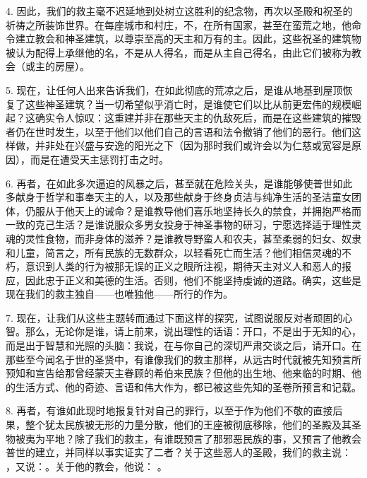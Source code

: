 4. 因此，我们的救主毫不迟延地到处树立这胜利的纪念物，再次以圣殿和祝圣的祈祷之所装饰世界。在每座城市和村庄，不，在所有国家，甚至在蛮荒之地，他命令建立教会和神圣建筑，以尊崇至高的天主和万有的主。因此，这些祝圣的建筑物被认为配得上承继他的名，不是从人得名，而是从主自己得名，由此它们被称为教会（或主的房屋）。\par

5. 现在，让任何人出来告诉我们，在如此彻底的荒凉之后，是谁从地基到屋顶恢复了这些神圣建筑？当一切希望似乎消亡时，是谁使它们以比从前更宏伟的规模崛起？这确实令人惊叹：这重建并非在那些天主的仇敌死后，而是在这些建筑的摧毁者仍在世时发生，以至于他们以他们自己的言语和法令撤销了他们的恶行。他们这样做，并非处在兴盛与安逸的阳光之下（因为那时我们或许会以为仁慈或宽容是原因），而是在遭受天主惩罚打击之时。\par

6. 再者，在如此多次逼迫的风暴之后，甚至就在危险关头，是谁能够使普世如此多献身于哲学和事奉天主的人，以及那些献身于终身贞洁与纯净生活的圣洁童女团体，仍服从于他天上的诫命？是谁教导他们喜乐地坚持长久的禁食，并拥抱严格而一致的克己生活？是谁说服众多男女投身于神圣事物的研习，宁愿选择适于理性灵魂的灵性食物，而非身体的滋养？是谁教导野蛮人和农夫，甚至柔弱的妇女、奴隶和儿童，简言之，所有民族的无数群众，以轻看死亡而生活？他们相信灵魂的不朽，意识到人类的行为被那无误的正义之眼所注视，期待天主对义人和恶人的报应，因此忠于正义和美德的生活。否则，他们不能坚持虔诚的道路。确实，这些是现在我们的救主独自——也唯独他——所行的作为。\par

7. 现在，让我们从这些主题转而通过下面这样的探究，试图说服反对者顽固的心智。那么，无论你是谁，请上前来，说出理性的话语：开口，不是出于无知的心，而是出于智慧和光照的头脑：我说，在与你自己的深切严肃交谈之后，请开口。在那些至今闻名于世的圣贤中，有谁像我们的救主那样，从远古时代就被先知预言所预知和宣告给那曾经蒙天主眷顾的希伯来民族？但他的出生地、他来临的时期、他的生活方式、他的奇迹、言语和伟大作为，都已被这些先知的圣卷所预言和记载。\par

8. 再者，有谁如此现时地报复针对自己的罪行，以至于作为他们不敬的直接后果，整个犹太民族被无形的力量分散，他们的王座被彻底移除，他们的圣殿及其圣物被夷为平地？除了我们的救主，有谁既预言了那邪恶民族的事，又预言了他教会普世的建立，并同样以事实证实了二者？关于这些恶人的圣殿，我们的救主说： ，又说：。关于他的教会，他说： 。\par

